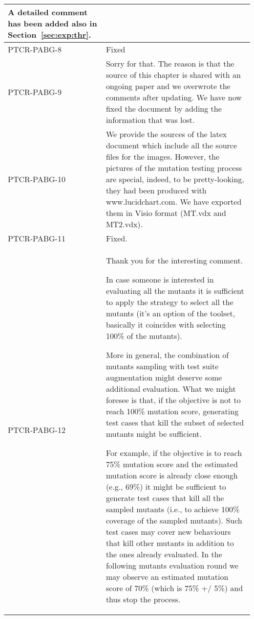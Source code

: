 \begin{longtable}{|p{1.5cm}|p{12cm}|@{}}
\begin{minipage}{12cm}
A detailed comment has been added also in Section~\ref{sec:exp:thr}.
\end{minipage}\\
\hline
PTCR-PABG-8&
\begin{minipage}{12cm}
Fixed
\end{minipage}\\
\hline
PTCR-PABG-9&
\begin{minipage}{12cm}
Sorry for that. The reason is that the source of this chapter is shared with an ongoing paper and we overwrote the comments after updating. We have now fixed the document by adding the information that was lost.
\end{minipage}\\
\hline
PTCR-PABG-10&
\begin{minipage}{12cm}
We provide the sources of the latex document which include all the source files for the images.
However, the pictures of the mutation testing process are special, indeed, to be pretty-looking, they had been produced with www.lucidchart.com. We have exported them in Visio format (MT.vdx and MT2.vdx).
\end{minipage}\\
\hline
PTCR-PABG-11&
\begin{minipage}{12cm}
Fixed.
\end{minipage}\\
\hline
PTCR-PABG-12&
\begin{minipage}{12cm}

Thank you for the interesting comment.

In case someone is interested in evaluating all the mutants it is sufficient to apply the strategy to select all the mutants (it's an option of the toolset, basically it coincides with selecting 100\% of the mutants).

More in general, the combination of mutants sampling with test suite augmentation might deserve some additional evaluation. What we might foresee is that, if the objective is not to reach 100\% mutation score, generating test cases that kill the subset of selected mutants might be sufficient.

For example, if the objective is to reach 75\% mutation score and the estimated mutation score is already close enough (e.g., 69\%) it might be sufficient to generate test cases that kill all the sampled mutants (i.e., to achieve 100\% coverage of the sampled mutants). Such test cases may cover new behaviours that kill other mutants in addition to the ones already evaluated. In the following mutants evaluation round we may observe an estimated mutation score of 70\% (which is 75\% +/ 5\%) and thus stop the process. 


\end{minipage}
\end{longtable}
